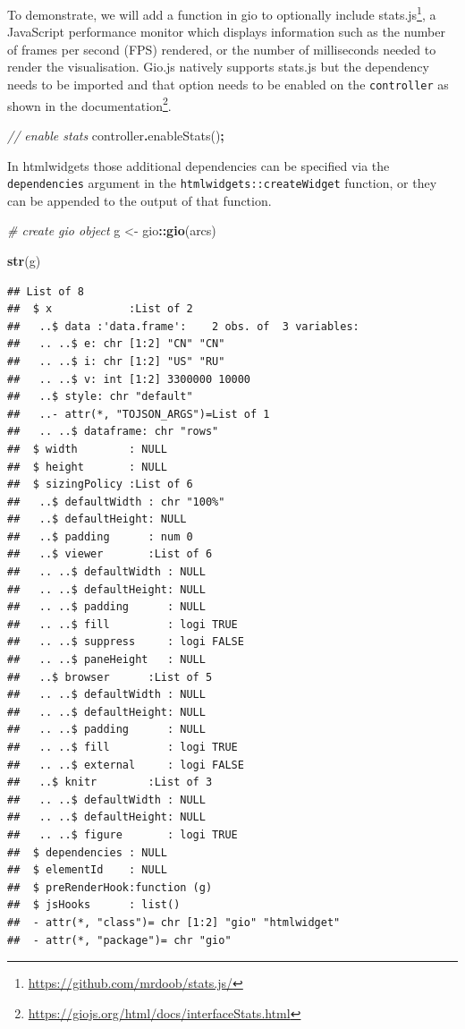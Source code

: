 \documentclass[
]{krantz}
\makeatletter
\newenvironment{Shaded}{\begin{snugshade}}{\end{snugshade}}
\newcommand{\CommentTok}[1]{\textcolor[rgb]{0.37,0.37,0.37}{\textit{#1}}}
\newcommand{\FunctionTok}[1]{\textcolor[rgb]{0,0,0}{#1}}
\newcommand{\KeywordTok}[1]{\textcolor[rgb]{0.27,0.27,0.27}{\textbf{#1}}}
\newcommand{\NormalTok}[1]{#1}
\newcommand{\OperatorTok}[1]{\textcolor[rgb]{0.43,0.43,0.43}{\textbf{#1}}}
\newcommand{\StringTok}[1]{\textcolor[rgb]{0.5,0.5,0.5}{#1}}
\renewcommand{\href}[2]{#2\footnote{\url{#1}}}
\newenvironment{kframe}{%
\medskip{}
\setlength{\fboxsep}{.8em}
 \def\at@end@of@kframe{}%
 \ifinner\ifhmode%
  \def\at@end@of@kframe{\end{minipage}}%
  \begin{minipage}{\columnwidth}%
 \fi\fi%
 \def\FrameCommand##1{\hskip\@totalleftmargin \hskip-\fboxsep
 \colorbox{shadecolor}{##1}\hskip-\fboxsep
     \hskip-\linewidth \hskip-\@totalleftmargin \hskip\columnwidth}%
 \MakeFramed {\advance\hsize-\width
   \@totalleftmargin\z@ \linewidth\hsize
   \@setminipage}}%
 {\par\unskip\endMakeFramed%
 \at@end@of@kframe}
\renewenvironment{Shaded}{\begin{kframe}}{\end{kframe}}
\makeatother
\begin{document}
To demonstrate, we will add a function in gio to optionally include \href{https://github.com/mrdoob/stats.js/}{stats.js}, a JavaScript performance monitor which displays information such as the number of frames per second (FPS) rendered, or the number of milliseconds needed to render the visualisation. Gio.js natively supports stats.js but the dependency needs to be imported and that option needs to be enabled on the \texttt{controller} as shown in the \href{https://giojs.org/html/docs/interfaceStats.html}{documentation}.

\begin{Shaded}
\begin{Highlighting}[]
\CommentTok{// enable stats}
\NormalTok{controller}\OperatorTok{.}\FunctionTok{enableStats}\NormalTok{()}\OperatorTok{;}
\end{Highlighting}
\end{Shaded}

In htmlwidgets those additional dependencies can be specified via the \texttt{dependencies} argument in the \texttt{htmlwidgets::createWidget} function, or they can be appended to the output of that function.

\begin{Shaded}
\begin{Highlighting}[]
\CommentTok{\# create gio object}
\NormalTok{g \textless{}{-}}\StringTok{ }\NormalTok{gio}\OperatorTok{::}\KeywordTok{gio}\NormalTok{(arcs)}

\KeywordTok{str}\NormalTok{(g)}
\end{Highlighting}
\end{Shaded}

\begin{verbatim}
## List of 8
##  $ x            :List of 2
##   ..$ data :'data.frame':    2 obs. of  3 variables:
##   .. ..$ e: chr [1:2] "CN" "CN"
##   .. ..$ i: chr [1:2] "US" "RU"
##   .. ..$ v: int [1:2] 3300000 10000
##   ..$ style: chr "default"
##   ..- attr(*, "TOJSON_ARGS")=List of 1
##   .. ..$ dataframe: chr "rows"
##  $ width        : NULL
##  $ height       : NULL
##  $ sizingPolicy :List of 6
##   ..$ defaultWidth : chr "100%"
##   ..$ defaultHeight: NULL
##   ..$ padding      : num 0
##   ..$ viewer       :List of 6
##   .. ..$ defaultWidth : NULL
##   .. ..$ defaultHeight: NULL
##   .. ..$ padding      : NULL
##   .. ..$ fill         : logi TRUE
##   .. ..$ suppress     : logi FALSE
##   .. ..$ paneHeight   : NULL
##   ..$ browser      :List of 5
##   .. ..$ defaultWidth : NULL
##   .. ..$ defaultHeight: NULL
##   .. ..$ padding      : NULL
##   .. ..$ fill         : logi TRUE
##   .. ..$ external     : logi FALSE
##   ..$ knitr        :List of 3
##   .. ..$ defaultWidth : NULL
##   .. ..$ defaultHeight: NULL
##   .. ..$ figure       : logi TRUE
##  $ dependencies : NULL
##  $ elementId    : NULL
##  $ preRenderHook:function (g)  
##  $ jsHooks      : list()
##  - attr(*, "class")= chr [1:2] "gio" "htmlwidget"
##  - attr(*, "package")= chr "gio"
\end{verbatim}
\end{document}
